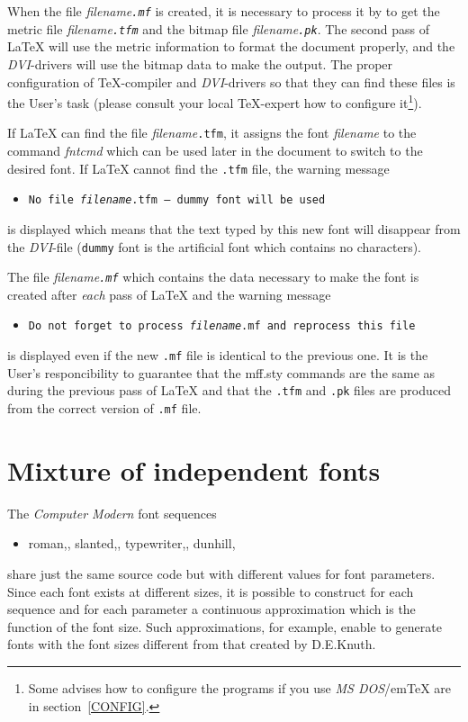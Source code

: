 When the file {\em filename{\tt.mf}} is created,
it is necessary to process it by \MF{} to get the metric
file {\em filename{\tt.tfm}} and the bitmap file
{\em filename{\tt.pk}}. The second pass of \LaTeX{} will use the metric
information to format the document properly, and the {\sl DVI}-drivers
will use the bitmap data to make the output.
The proper configuration of \TeX-compiler and {\sl DVI}-drivers
so that they can find these files is the User's task
(please consult your local \TeX-expert how to configure
it\footnote{Some advises how to configure the programs
if you use {\sl MS DOS}/{\sf em\TeX} are in section~\ref{CONFIG}.}).

If \LaTeX{} can find the file {\em filename}{\tt .tfm}, it assigns
the font {\em filename} to the command {\em{\tt\bs}fntcmd} which
can be used later in the document to switch to the desired font.
If \LaTeX{} cannot find the {\tt .tfm} file, the warning message
\begin{itemize}
\item[] {\tt No file {\em filename}.tfm -- dummy font will be used}
\end{itemize}
is displayed which means that the text typed by this new font
will disappear from the {\sl DVI}-file ({\tt dummy} font is the
artificial font which contains no characters).

The file {\em filename{\tt.mf}} which contains the \MF{} data
necessary to make the font is created after {\em each} pass
of \LaTeX{} and the warning message
\begin{itemize}
\item[] {\tt Do not forget to process {\em filename}.mf
             and reprocess this file}
\end{itemize}
is displayed even if the new {\tt .mf} file is identical to the previous
one. It is the User's responcibility to guarantee that the {\sc mff.sty}
commands are the same as during the previous pass of \LaTeX{} and that
the {\tt .tfm} and {\tt .pk} files are produced from the correct version
of {\tt .mf} file.

\section{Mixture of independent fonts\label{MIXTURE}}

The {\sl Computer Modern} font sequences
\begin{itemize}
\item[]\begin{flushleft}
{\cmcmr roman},,\quad
{\cmcmsl slanted},,\quad
{\cmcmtt typewriter},,\quad
{\cmdunh dunhill},\end{flushleft}
\end{itemize}
share just the same \MF{} source code but with different values for
font parameters. Since each font exists at different sizes, it is
possible to construct for each sequence and for each parameter
a continuous approximation which is the function of the font size.
Such approximations, for example, enable to generate fonts with the
font sizes different from that created by D.E.Knuth.

